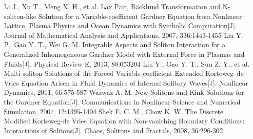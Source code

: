 \begin{thebibliography}{0}
 Li J., Xu T., Meng X. H., et al. Lax Pair, B\"{a}cklund Transformation and N-soliton-like Solution for a Variable-coefficient Gardner Equation from Nonlinear Lattice, Plasma Physics and Ocean Dynamics with Symbolic Computation[J]. Journal of Mathematical Analysis and Applications, 2007, 336:1443-1455%
     Liu Y. P., Gao Y. T., Wei G. M. Integrable Aspects and Soliton Interaction for a Generalized Inhomogeneous Gardner Model with External Force in Plasmas and Fluids[J]. Physical Review E, 2013, 88:053204 %
     Liu Y., Gao Y. T., Sun Z. Y., et al. Multi-soliton Solutions of the Forced Variable-coefficient Extended Korteweg–de Vries Equation Arisen in Fluid Dynamics of Internal Solitary Waves[J]. Nonlinear Dynamics, 2011, 66:575-587
     Wazwaz A. M. New Solitons and Kink Solutions for the Gardner Equation[J]. Communications in Nonlinear Science and Numerical Simulation, 2007, 12:1395-1404
     Shek E. C. M., Chow K. W. The Discrete Modified Korteweg-de Vries Equation with Non-vanishing Boundary Conditions: Interactions of Solitons[J]. Chaos, Solitons and Fractals, 2008, 36:296-302





\end{thebibliography}
